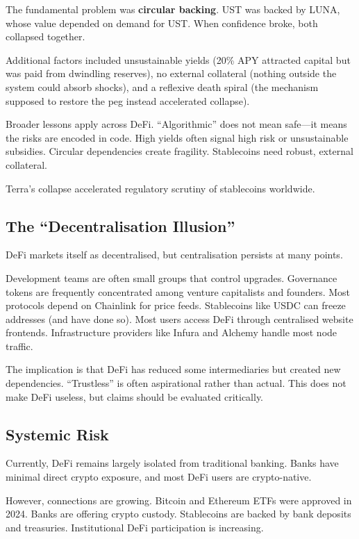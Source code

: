\documentclass[11pt,a4paper]{article}
\newcommand{\keyword}[1]{\textbf{\textcolor{AccentOrange}{#1}}}
\begin{document}
The fundamental problem was \keyword{circular backing}. UST was backed by LUNA, whose value depended on demand for UST. When confidence broke, both collapsed together.

Additional factors included unsustainable yields (20\% APY attracted capital but was paid from dwindling reserves), no external collateral (nothing outside the system could absorb shocks), and a reflexive death spiral (the mechanism supposed to restore the peg instead accelerated collapse).

Broader lessons apply across DeFi. ``Algorithmic'' does not mean safe---it means the risks are encoded in code. High yields often signal high risk or unsustainable subsidies. Circular dependencies create fragility. Stablecoins need robust, external collateral.

Terra's collapse accelerated regulatory scrutiny of stablecoins worldwide.

\subsection{The ``Decentralisation Illusion''}

DeFi markets itself as decentralised, but centralisation persists at many points.

Development teams are often small groups that control upgrades. Governance tokens are frequently concentrated among venture capitalists and founders. Most protocols depend on Chainlink for price feeds. Stablecoins like USDC can freeze addresses (and have done so). Most users access DeFi through centralised website frontends. Infrastructure providers like Infura and Alchemy handle most node traffic.

The implication is that DeFi has reduced some intermediaries but created new dependencies. ``Trustless'' is often aspirational rather than actual. This does not make DeFi useless, but claims should be evaluated critically.

\subsection{Systemic Risk}

Currently, DeFi remains largely isolated from traditional banking. Banks have minimal direct crypto exposure, and most DeFi users are crypto-native.

However, connections are growing. Bitcoin and Ethereum ETFs were approved in 2024. Banks are offering crypto custody. Stablecoins are backed by bank deposits and treasuries. Institutional DeFi participation is increasing.
\end{document}
